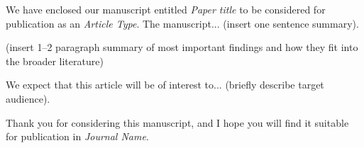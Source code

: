 \documentclass[11pt,stdletter,orderfromtodate,sigleft]{newlfm}
\newcommand{\journal}{Journal Name}
\newcommand{\articletype}{Article Type}
\newcommand{\title}{Paper title}
\begin{document}
\begin{newlfm}
  We have enclosed our manuscript entitled \textit{\title} to be
  considered for publication as an \textit{\articletype}.  The
  manuscript... (insert one sentence summary).

(insert 1--2 paragraph summary of most important findings and how they
fit into the broader literature)

We expect that this article will be of interest to... (briefly describe target audience).

Thank you for considering this manuscript, and I hope you will find it suitable for publication in \textit{\journal}.


\end{newlfm}
\end{document}
